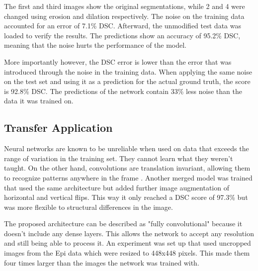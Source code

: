 The first and third images show the original segmentations, while 2 and 4 were changed using erosion and dilation respectively. The noise on the training data accounted for an error of 7.1\% DSC. Afterward, the unmodified test data was loaded to verify the results. The predictions show an accuracy of 95.2\% DSC, meaning that the noise hurts the performance of the model.

More importantly however, the DSC error is lower than the error that was introduced through the noise in the training data. When applying the same noise on the test set and using it as a prediction for the actual ground truth, the score is 92.8\% DSC. The predictions of the network contain 33\% less noise than the data it was trained on.

\subsection{Transfer Application}

Neural networks are known to be unreliable when used on data that exceeds the range of variation in the training set. They cannot learn what they weren't taught. On the other hand, convolutions are translation invariant, allowing them to recognize patterns anywhere in the frame \cite{Chollet2017}. Another merged model was trained that used the same architecture but added further image augmentation of horizontal and vertical flips. This way it only reached a DSC score of 97.3\% but was more flexible to structural differences in the image.

The proposed architecture can be described as "fully convolutional" because it doesn't include any dense layers. This allows the network to accept any resolution and still being able to process it. An experiment was set up that used uncropped images from the Epi data which were resized to 448x448 pixels. This made them four times larger than the images the network was trained with.

